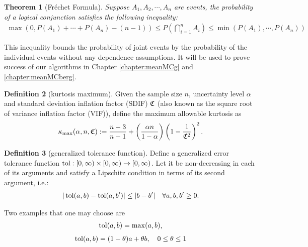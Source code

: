 \documentclass{iitthesis}
\newtheorem{theorem}{Theorem}[section]
\theoremstyle{definition}
\newtheorem{defn}[theorem]{Definition}
\begin{document}

\begin{theorem}[Fr\'{e}chet Formula] \cite{Frechet35}
Suppose $A_1, A_2,\cdots,A_n$ are events, the probability of a logical conjunction satisfies the following inequality:
\begin{multline}
 \max(0, P(A_1) + \cdots +P(A_n)-(n -1)) \leq P\left(\bigcap_{i=1}^n A_i\right) \leq \min(P(A_1),  \cdots, P(A_n))
\end{multline}
\end{theorem}
This inequality bounds the probability of joint events by the probability of the individual events without any dependence assumptions. It will be used to prove success of our algorithms in Chapter \ref{chapter:meanMCg} and \ref{chapter:meanMCberg}.


\begin{defn}[kurtosis maximum]
Given the sample size $n$, uncertainty level $\alpha$ and standard deviation inflation factor (SDIF) $\mathfrak{C}$ (also known as the square root of variance inflation factor (VIF)), define the maximum allowable kurtosis as
\begin{equation}
\label{def:kmax}
\kappa_{\max}(\alpha, n,\mathfrak{C}):= \frac{n-3}{n-1} + \left(\frac{ \alpha n}{1-\alpha}\right) \left(1 - \frac{1}{\mathfrak{C}^2}\right)^2.
\end{equation}
\end{defn}

\begin{defn}[generalized tolerance function]\label{def:tolfun}
 Define a generalized error tolerance function $\operatorname{tol}: [0, \infty) \times [0, \infty) \to [0,\infty)$. Let it be non-decreasing in each of its arguments and satisfy a Lipschitz condition in terms of its second argument, i.e.:
\begin{align}\label{lipschitztolfun}
|\operatorname{tol}(a,b)-\operatorname{tol}(a,b')| \leq |b-b'| \quad \forall a,b,b' \geq 0.
\end{align}
\end{defn}
Two examples that one may choose are
\begin{align*}
\operatorname{tol}(a,b) = \max (a,b),
\end{align*}
\begin{align*}
\operatorname{tol}(a,b) = (1- \theta) a + \theta b, \quad 0 \leq \theta \leq 1
\end{align*}
\end{document}
